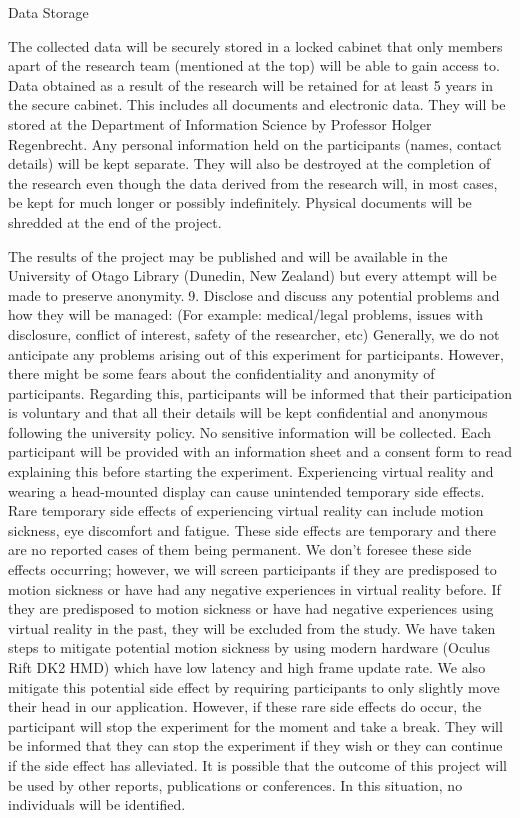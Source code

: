 Data Storage

The collected data will be securely stored in a locked cabinet that only members apart of the research team (mentioned at the top) will be able to gain access to. Data obtained as a result of the research will be retained for at least 5 years in the secure cabinet. This includes all documents and electronic data. They will be stored at the Department of Information Science by Professor Holger Regenbrecht. Any personal information held on the participants (names, contact details) will be kept separate. They will also be destroyed at the completion of the research even though the data derived from the research will, in most cases, be kept for much longer or possibly indefinitely. Physical documents will be shredded at the end of the project.  

The results of the project may be published and will be available in the University of Otago Library (Dunedin, New Zealand) but every attempt will be made to preserve anonymity.9.	Disclose and discuss any potential problems and how they will be managed: (For example: medical/legal problems, issues with disclosure, conflict of interest, safety of the researcher, etc)
Generally, we do not anticipate any problems arising out of this experiment for participants. However, there might be some fears about the confidentiality and anonymity of participants. Regarding this, participants will be informed that their participation is voluntary and that all their details will be kept confidential and anonymous following the university policy. No sensitive information will be collected. Each participant will be provided with an information sheet and a consent form to read explaining this before starting the experiment. 
Experiencing virtual reality and wearing a head-mounted display can cause unintended temporary side effects. Rare temporary side effects of experiencing virtual reality can include motion sickness, eye discomfort and fatigue. These side effects are temporary and there are no reported cases of them being permanent. We don’t foresee these side effects occurring; however, we will screen participants if they are predisposed to motion sickness or have had any negative experiences in virtual reality before. If they are predisposed to motion sickness or have had negative experiences using virtual reality in the past, they will be excluded from the study. We have taken steps to mitigate potential motion sickness by using modern hardware (Oculus Rift DK2 HMD) which have low latency and high frame update rate. We also mitigate this potential side effect by requiring participants to only slightly move their head in our application. However, if these rare side effects do occur, the participant will stop the experiment for the moment and take a break. They will be informed that they can stop the experiment if they wish or they can continue if the side effect has alleviated. 
It is possible that the outcome of this project will be used by other reports, publications or conferences. In this situation, no individuals will be identified. 

